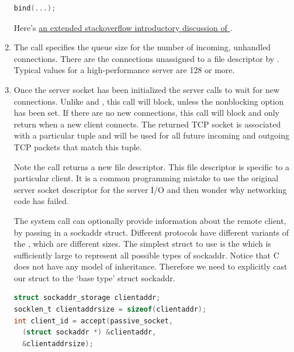 \begin{enumerate}
\begin{lstlisting}[language=C]
bind(...);
  \end{lstlisting}

  Here's \href{http://stackoverflow.com/questions/14388706/socket-options-so-reuseaddr-and-so-reuseport-how-do-they-differ-do-they-mean-t}{an extended stackoverflow introductory discussion of }.

  \item {}

    The  call specifies the queue size for the number of incoming, unhandled connections.
    There are the connections unassigned to a file descriptor by .
    Typical values for a high-performance server are 128 or more.

  \item {}

  Once the server socket has been initialized the server calls  to wait for new connections.
  Unlike   and , this call will block, unless the nonblocking option has been set.
  If there are no new connections, this call will block and only return when a new client connects.
  The returned TCP socket is associated with a particular tuple  and will be used for all future incoming and outgoing TCP packets that match this tuple.

  Note the  call returns a new file descriptor.
  This file descriptor is specific to a particular client.
  It is a common programming mistake to use the original server socket descriptor for the server I/O and then wonder why networking code has failed.

  The  system call can optionally provide information about the remote client, by passing in a sockaddr struct.
  Different protocols have different variants of the , which are different sizes.
  The simplest struct to use is the  which is sufficiently large to represent all possible types of sockaddr.
  Notice that C does not have any model of inheritance.
  Therefore we need to explicitly cast our struct to the `base type' struct sockaddr.

  \begin{lstlisting}[language=C]
struct sockaddr_storage clientaddr;
socklen_t clientaddrsize = sizeof(clientaddr);
int client_id = accept(passive_socket,
  (struct sockaddr *) &clientaddr,
  &clientaddrsize);
  \end{lstlisting}


\end{enumerate}
